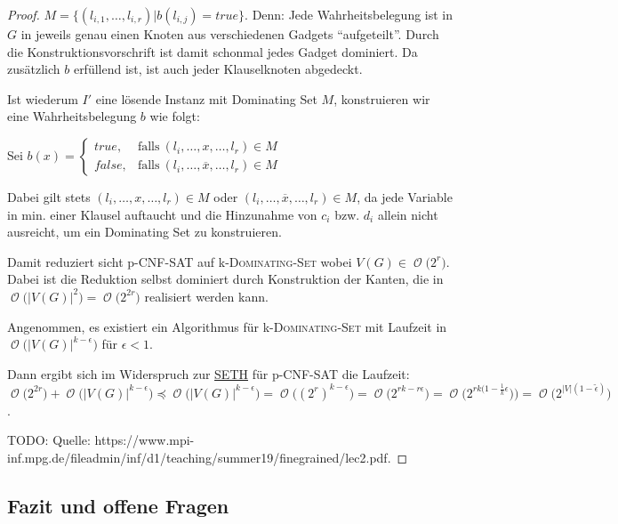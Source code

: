 \documentclass[a4paper,ngerman]{atseminar}
\newcommand{\BigO}[1]{\ensuremath{\operatorname{\mathcal{O}}\bigl(#1\bigr)}\xspace}
\begin{document}
\begin{proof}
  \noindent
  $M = \{(l_{i,1}, \dots, l_{i,r}) | b(l_{i,j}) = true\}$.
  Denn: Jede Wahrheitsbelegung ist in $G$ in jeweils genau einen Knoten aus verschiedenen Gadgets \enquote{aufgeteilt}. Durch die Konstruktionsvorschrift
  ist damit schonmal jedes Gadget dominiert. Da zusätzlich $b$ erfüllend ist, ist auch jeder Klauselknoten abgedeckt.

  \noindent
  Ist wiederum $I'$ eine lösende Instanz mit Dominating Set $M$, konstruieren wir eine Wahrheitsbelegung $b$ wie folgt:

  \vspace{0.25cm}
  Sei $b(x) = \begin{cases}
    true, & \text{falls}\ (l_i, \dots, x, \dots, l_r) \in M \\
    false, & \text{falls}\ (l_i, \dots, \overline{x}, \dots, l_r) \in M
  \end{cases}$
  \vspace{0.25cm}

  \noindent
  Dabei gilt stets $(l_i, \dots, x, \dots, l_r) \in M$ oder $(l_i, \dots, \overline{x}, \dots, l_r) \in M$, da jede Variable in min. einer Klausel auftaucht und die
  Hinzunahme von $c_i$ bzw. $d_i$ allein nicht ausreicht, um ein Dominating Set zu konstruieren.



  \noindent
  Damit reduziert sicht p-\textsc{CNF-SAT} auf k-\textsc{Dominating-Set} wobei $V(G) \in \BigO{2^r}$.
  Dabei ist die Reduktion selbst dominiert durch Konstruktion der Kanten, die in $\BigO{|V(G)|^2} = \BigO{2^{2r}}$ realisiert werden kann. 

  \vspace{0.25cm}
  \noindent
  Angenommen, es existiert ein Algorithmus für k-\textsc{Dominating-Set} mit Laufzeit in \BigO{|V(G)|^{k - \epsilon}} für $\epsilon < 1$.

  \noindent
  Dann ergibt sich im Widerspruch zur \hyperref[oe:definition:seth]{SETH} für p-\textsc{CNF-SAT} die Laufzeit:
  \\
  $\BigO{2^{2r}} + \BigO{|V(G)|^{k - \epsilon}} \preceq \BigO{|V(G)|^{k - \epsilon}} = \BigO{(2^{r})^{k - \epsilon}} = \BigO{2^{rk - r \epsilon}} = \BigO{2^{rk (1 - \frac{1}{k}\epsilon})} = \BigO{2^{|V| (1 - \tilde{\epsilon})}}$.

  \noindent
  TODO: Quelle: https://www.mpi-inf.mpg.de/fileadmin/inf/d1/teaching/summer19/finegrained/lec2.pdf.
\end{proof}

\subsection{Fazit und offene Fragen}
\end{document}
